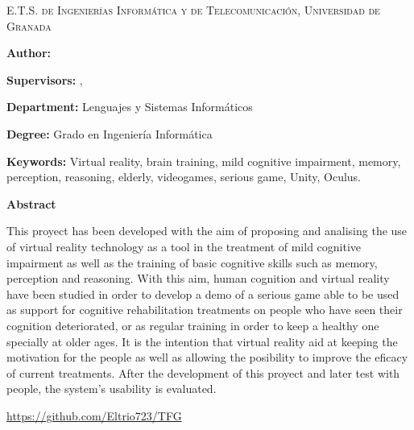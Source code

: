 
\pagestyle{fancy}

\begin{center}
	\scshape
	E.T.S. de Ingenierías Informática y de Telecomunicación, Universidad de Granada
\end{center}

\bigskip

\begin{center}
	\Large \scshape
	\textbf{\tfgtitlenameENG}
\end{center}

\bigskip \bigskip \bigskip

\begin{minipage}{\textwidth}

\textbf{Author:} \tfgauthorname

\medskip

\textbf{Supervisors:} \tfgtutornameA , \tfgtutornameB

\medskip


\medskip

\textbf{Department:} Lenguajes y Sistemas Informáticos

\medskip

\textbf{Degree:} Grado en Ingeniería Informática

\medskip

\textbf{Keywords:} Virtual reality, brain training, mild cognitive impairment, memory, perception, reasoning, elderly, videogames, serious game, Unity, Oculus.

\bigskip \bigskip


\end{minipage}

\begin{center}
	\textbf{Abstract}
\end{center}



This proyect has been developed with the aim of proposing and analising the use of virtual reality technology as a tool in the treatment of mild cognitive impairment as well as the training of basic cognitive skills such as memory, perception and reasoning. With this aim, human cognition and virtual reality have been studied in order to develop a demo of a serious game able to be used as support for cognitive rehabilitation treatments on people who have seen their cognition deteriorated, or as regular training in order to keep a healthy one specially at older ages. It is the intention that virtual reality aid at keeping the motivation for the people as well as allowing the posibility to improve the eficacy of current treatments. After the development of this proyect and later test with people, the system's usability is evaluated.


\url{https://github.com/Eltrio723/TFG}

\blankpage
